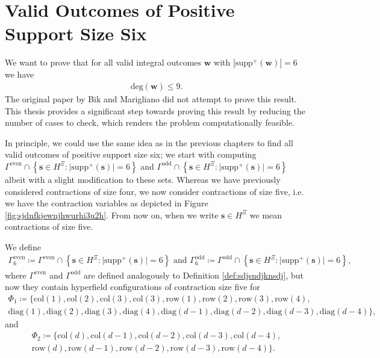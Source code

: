 \chapter{Valid Outcomes of Positive Support Size Six}

We want to prove that for all valid integral outcomes \( \mathbf w \) with \( |\mathrm{supp}^+(\mathbf w)| = 6 \) we have
\begin{align*}
    \mathrm{deg}(\mathbf w) \leq 9.
\end{align*}
The original paper by Bik and Marigliano \cite{bik2022classifying} did not attempt to prove this result. This thesis provides a significant step towards proving this result by reducing the number of cases to check, which renders the problem computationally feasible. 

In principle, we could use the same idea as in the previous chapters to find all valid outcomes of positive support size six; we start with computing \(  \Gamma^{\mathrm{even}} \cap \left\{ \mathbf{s} \in H^{\Xi} : \lvert \mathrm{supp}^+(\mathbf{s}) \rvert = 6 \right\} \) and \( \Gamma^{\mathrm{odd}} \cap \left\{ \mathbf{s} \in H^{\Xi} : \lvert \mathrm{supp}^+(\mathbf{s}) \rvert = 6 \right\} \)
albeit with a slight modification to these sets. Whereas we have previously considered contractions of size four, we now consider contractions of size five, i.e. we have the contraction variables as depicted in Figure \ref{fig:sjdnfkjewnjhwurhi3u2h}. From now on, when we write \( \mathbf{s} \in H^{\Xi} \) we mean contractions of size five.

\begin{definition}
    We define 
    \begin{gather*}
        \Gamma^{\mathrm{even}}_6 \coloneqq \Gamma^{\mathrm{even}} \cap \left\{ \mathbf{s} \in H^{\Xi} : \lvert \mathrm{supp}^+(\mathbf{s}) \rvert = 6 \right\}
        \text{ and }
        \Gamma^{\mathrm{odd}}_6 \coloneqq \Gamma^{\mathrm{odd}} \cap \left\{ \mathbf{s} \in H^{\Xi} : \lvert \mathrm{supp}^+(\mathbf{s}) \rvert = 6 \right\},
    \end{gather*}
    where \( \Gamma^{\mathrm{even}}  \) and \(  \Gamma^{\mathrm{odd}} \) are defined analogously to Definition \ref{def:sdjsndjknsdj}, but now they contain hyperfield configurations of contraction size five for 
    \begin{gather*}
        \Phi_1 \coloneqq \{ 
            \mathrm{col}(1), \mathrm{col}(2), \mathrm{col}(3), \mathrm{col}(3), \mathrm{row}(1), \mathrm{row}(2), \mathrm{row}(3),  \mathrm{row}(4),\\
             \mathrm{diag}(1), \mathrm{diag}(2), \mathrm{diag}(3), \mathrm{diag}(4), \mathrm{diag}(d-1), \mathrm{diag}(d-2), \mathrm{diag}(d-3), \mathrm{diag}(d-4) 
         \},
    \end{gather*}
    and 
    \begin{gather*}
        \Phi_2 \coloneqq \{ 
            \mathrm{col}(d), \mathrm{col}(d-1), \mathrm{col}(d-2), \mathrm{col}(d-3), \mathrm{col}(d-4), \\
            \mathrm{row}(d), \mathrm{row}(d-1), \mathrm{row}(d-2), \mathrm{row}(d-3), \mathrm{row}(d-4) 
         \}.
    \end{gather*}
\end{definition}


